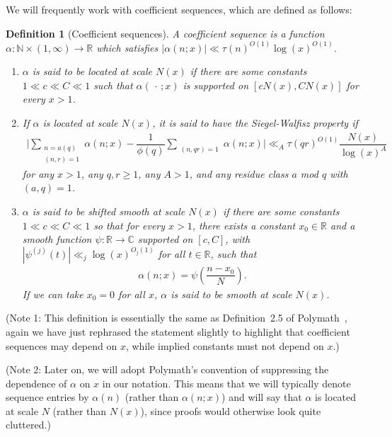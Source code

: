 \documentclass{amsart}
\newtheorem{defn}{Definition}
\numberwithin{equation}{section}
\begin{document}
\vspace{3mm}

We will frequently work with coefficient sequences, which are defined as follows: 

\begin{defn}[Coefficient sequences]\label{def:sequence}  A  coefficient sequence  is  a function $\alpha: \mathbb{N} \times (1, \infty) \rightarrow \mathbb{R}$ which satisfies $|\alpha(n;x)| \ll \tau(n)^{O(1)}\log(x)^{O(1)}$. 
\begin{enumerate}[{\rm (i)}]
\item $\alpha$ is said to be located at scale $N(x)$ if there are some constants $1 \ll c \ll C \ll 1$ such that   $\alpha(\,\cdot\,;x)$ is supported on $[cN(x),CN(x)]$ for every $x>1$.
\item If $\alpha$ is located at scale $N(x)$, it is said to have the Siegel-Walfisz property if 
\begin{align*}
\Bigg| \sum_{\substack{n=a (q) \\ (n,r)=1 }} \alpha(n;x)  -\dfrac{1}{\phi(q)}\sum_{\substack{ (n,qr)=1 }} \alpha(n;x) \Bigg| \ll_A \tau(qr)^{O(1)}\dfrac{ N(x) }{\log(x)^{A}}
\end{align*}
for any $x>1$, any $q, r \geq 1$, any $A >1$, and any  residue class $a$ mod $q$ with $(a,q)=1$. 
\item $\alpha$ is said to be shifted smooth at scale $N(x)$ if there are some constants $1\ll c \ll C \ll 1$ so that for every $x>1$, there exists a constant $x_0 \in \mathbb{R}$ and a  smooth function $\psi:\mathbb{R} \rightarrow \mathbb{C}$ supported on $[c,C]$, with $|\psi^{(j)}(t)| \ll_j \log(x)^{O_j(1)}$ for all $t \in \mathbb{R}$, such that 
\begin{align*}
\alpha(n;x) = \psi\left(\dfrac{n-x_0}{N}\right).
\end{align*}
If we can take $x_0=0$ for all $x$, $\alpha$ is said to be smooth at scale $N(x)$. 
\end{enumerate}
\end{defn}

(Note 1: This definition is essentially the same as  Definition~2.5 of   Polymath~\cite{Polymath:2014:EDZ}, again we have just rephrased the statement slightly to highlight that coefficient sequences may depend on $x$, while implied constants must not depend on $x$.) \vspace{2mm}

(Note 2: Later on, we will adopt Polymath's convention of suppressing the dependence of $\alpha$ on $x$ in our notation. This means that  we will typically denote sequence entries by $\alpha(n)$ (rather than $\alpha(n;x)$) and will say that $\alpha$ is located at scale $N$ (rather than $N(x)$), since proofs would otherwise look quite cluttered.) 
\vspace{2mm}
\end{document}

